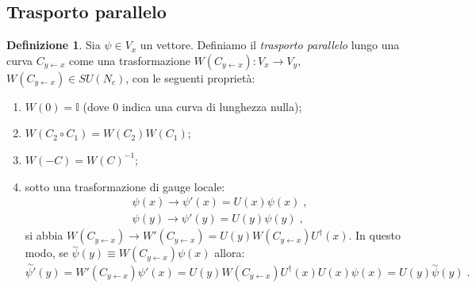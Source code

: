 \documentclass[12pt,a4paper]{article}
\theoremstyle{definition}
\newtheorem{dfn}{Definizione}[section]
\newcommand{\adj}[1]{#1^{\dagger}}
\numberwithin{equation}{section}
\begin{document}
\subsection{Trasporto parallelo}
\begin{dfn}
Sia $\psi\in V_x$ un vettore. Definiamo il \emph{trasporto parallelo} lungo una curva $C_{y\leftarrow x}$ come una trasformazione $W(C_{y\leftarrow x}):V_x\to V_y$, $W(C_{y\leftarrow x})\in SU(N_c)$, con le seguenti proprietà:
\begin{enumerate}
\item $W(0)=\mathbb{I}$ (dove $0$ indica una curva di lunghezza nulla);
\item $W(C_2\circ C_1)=W(C_2)W(C_1)$;
\item $W(-C)=W(C)^{-1}$;
\item sotto una trasformazione di gauge locale:
\begin{align*}
&\psi(x)\to\psi'(x)=U(x)\psi(x)\;, \\
&\psi(y)\to\psi'(y)=U(y)\psi(y)\;,
\end{align*}
si abbia $W(C_{y\leftarrow x})\to W'(C_{y\leftarrow x})=U(y)W(C_{y\leftarrow x})\adj{U}(x)$. In questo modo, se $\stackrel{\sim}{\psi}(y)\equiv W(C_{y\leftarrow x})\psi(x)$ allora:
$$
\stackrel{\sim}{\psi'}(y)=W'(C_{y\leftarrow x})\psi'(x)=U(y)W(C_{y\leftarrow x})\adj{U}(x)U(x)\psi(x)=U(y)\stackrel{\sim}{\psi}(y)\;.
$$
\end{enumerate}
\end{dfn}
\end{document}
